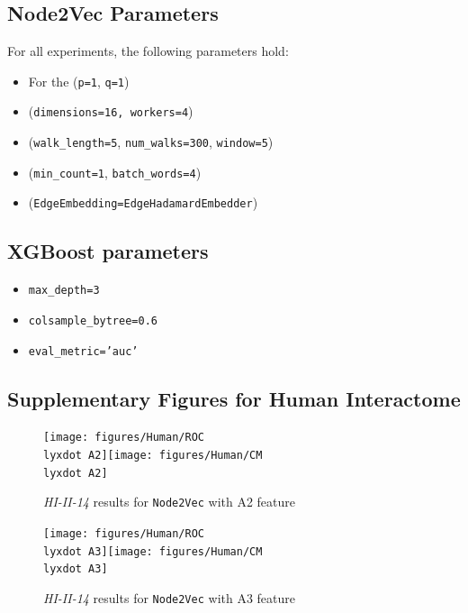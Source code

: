 \subsection*{Node2Vec Parameters}

For all experiments, the following parameters hold:
\begin{itemize}
\item For the (\texttt{p=1}, \texttt{q=1})
\item (\texttt{dimensions=16, workers=4})
\item (\texttt{walk\_length=5}, \texttt{num\_walks=300}, \texttt{window=5})
\item (\texttt{min\_count=1}, \texttt{batch\_words=4})
\item (\texttt{EdgeEmbedding=EdgeHadamardEmbedder})
\end{itemize}

\subsection*{XGBoost parameters}
\begin{itemize}
\item \texttt{max\_depth=3}
\item \texttt{colsample\_bytree=0.6}
\item \texttt{eval\_metric='auc'}
\end{itemize}



\subsection*{Supplementary Figures for Human Interactome}

\begin{figure}[h]
\noindent \begin{centering}
\caption{\label{HI1}\emph{HI-II-14} results for \texttt{Node2Vec} with A2
feature}
\par\end{centering}
\noindent \raggedleft{}\texttt{[image: figures/Human/ROC\\lyxdot A2]}\texttt{[image: figures/Human/CM\\lyxdot A2]}
\end{figure}

\begin{figure}[h]
\noindent \begin{centering}
\caption{\label{HI2}\emph{HI-II-14} results for \texttt{Node2Vec} with A3
feature}
\par\end{centering}
\noindent \raggedleft{}\texttt{[image: figures/Human/ROC\\lyxdot A3]}\texttt{[image: figures/Human/CM\\lyxdot A3]}
\end{figure}

